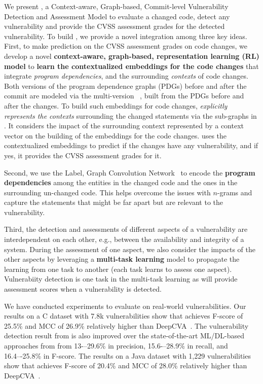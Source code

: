 
We present {\tool}, a Context-aware, Graph-based, Commit-level
Vulnerability Detection and Assessment Model to evaluate a changed
code, detect any vulnerability and provide the CVSS
assessment grades for the detected vulnerability. To build {\tool}, we
provide a novel integration among three key ideas. First, to make
prediction on the CVSS assessment grades on code changes, we develop a
novel {\bf context-aware, graph-based, representation learning (RL)
  model} to {\bf learn the contextualized embeddings for the code
  changes} that integrate {\em program dependencies}, and the
surrounding {\em contexts} of code changes.  Both versions of the
program dependence graphs (PDGs) before and after the commit are
modeled via the multi-version {\mvpdg}~\cite{flexeme-fse20},
built from the PDGs before and after the changes.
To build such embeddings for code changes, {\tool} {\em explicitly
  represents the contexts} surrounding the changed statements via the
sub-graphs in {\mvpdg}. It considers the impact of the surrounding
context represented by a context vector on the building of the
embeddings for the code changes. {\tool} uses the contextualized
embeddings to predict if the changes have any vulnerability, and if
yes, it provides the CVSS assessment grades for it.

Second, we use the Label, Graph Convolution
Network~\cite{label-gcn} to encode the {\bf program dependencies}
among the entities in the changed code and the ones in the
surrounding un-changed code. This helps overcome the issues
with $n$-grams and capture the statements that might be far
apart but are relevant to the vulnerability.

Third, the detection and assessments of different aspects of a
vulnerability are interdependent on each other, e.g., between the
availability and integrity of a system. During the assessment of one
aspect, we also consider the impacts of the other aspects by
leveraging a {\bf multi-task learning} model to propagate the learning
from one task to another (each task learns to assess one
aspect). Vulnerabiity detection is one task in the multi-task learning
as {\tool} will provide assessment scores when a vulnerability is
detected.

We have conducted experiments to evaluate {\tool} on real-world
vulnerabilities. Our results on a C dataset with 7.8k vulnerabilities
show that {\tool} achieves F-score of 25.5\% and MCC of 26.9\%
relatively higher than DeepCVA~\cite{deepCVA-ase21}.  The
vulnerability detection result from {\tool} is also improved over the
state-of-the-art ML/DL-based approaches from from 13-–29.6\% in
precision, 15.6-–28.9\% in recall, and 16.4–-25.8\% in F-score. The
results on a Java dataset with 1,229 vulnerabilities show that {\tool}
achieves F-score of 20.4\% and MCC of 28.0\% relatively higher than
DeepCVA~\cite{deepCVA-ase21}.

